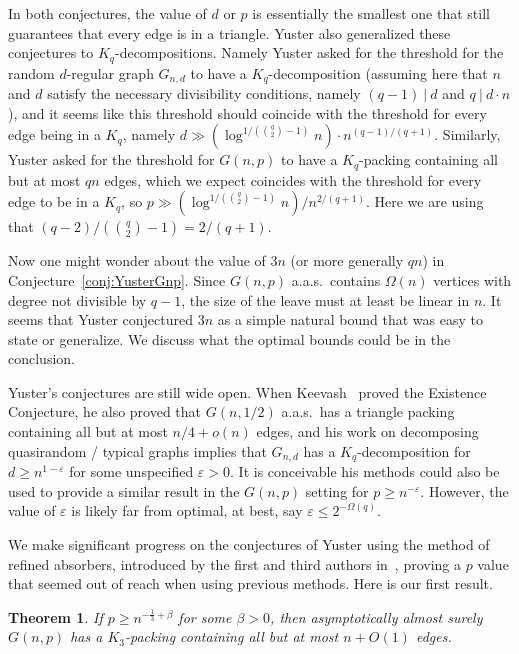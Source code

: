 \documentclass[11pt]{article}
\numberwithin{equation}{section}
\newcommand{\eps}{\varepsilon}
\newcounter{i}
\theoremstyle{plain}
\newtheorem{thm}{Theorem}[section]
\theoremstyle{plain} %
\theoremstyle{definition}
\newcommand{\aas}{a.a.s.\ }
\begin{document}
In both conjectures, the value of $d$ or $p$ is essentially the smallest one that still guarantees that every edge is in a triangle. 
Yuster also generalized these conjectures to $K_q$-decompositions.
Namely Yuster asked for the threshold for the random $d$-regular graph $G_{n,d}$ to have a $K_q$-decomposition (assuming here that $n$ and $d$ satisfy the necessary divisibility conditions, namely $(q-1)~|~d$ and $q~|~d\cdot n$), and it seems like this threshold should coincide with the threshold for every edge being in a $K_q$, namely $d \gg \left(\log^{1/\left(\binom{q}{2}-1\right)}n\right)\cdot n^{(q-1)/(q+1)}$.  Similarly, Yuster asked for the threshold for $G(n, p)$ to have a $K_q$-packing containing all but at most $qn$ edges, which we expect coincides with the threshold for every edge to be in a $K_q$, so $p \gg \left(\log^{1/\left(\binom{q}{2}-1\right)}n\right) / n^{2/(q+1)}$.  Here we are using that $(q - 2)/\left(\binom{q}{2} - 1\right) = 2/(q + 1)$.

Now one might wonder about the value of $3n$ (or more generally $qn$) in Conjecture~\ref{conj:YusterGnp}. 
Since $G(n,p)$ \aas contains $\Omega(n)$ vertices with degree not divisible by $q - 1$, the size of the leave must at least be linear in $n$.
It seems that Yuster conjectured $3n$ as a simple natural bound that was easy to state or generalize. 
We discuss what the optimal bounds could be in the conclusion. 

Yuster's conjectures are still wide open.  When Keevash~\cite{K14} proved the Existence Conjecture, he also proved that $G(n, 1/2)$ \aas has a triangle packing containing all but at most $n/4 + o(n)$ edges, and his work on decomposing quasirandom / typical graphs implies that $G_{n,d}$ has a $K_q$-decomposition for $d \geq n^{1 - \eps}$ for some unspecified $\eps > 0$.  It is conceivable his methods could also be used to provide a similar result in the $G(n,p)$ setting for $p \geq n^{-\eps}$.  However, the value of $\eps$ is likely far from optimal, at best, say $\eps \leq 2^{-\Omega(q)}$.

We make significant progress on the conjectures of Yuster using the method of refined absorbers, introduced by the first and third authors in~\cite{DPI}, proving a $p$ value that seemed out of reach when using previous methods.
Here is our first result. 

\begin{thm}\label{thm:YusterTriangle}
If $p\ge n^{-\frac{1}{3}+\beta}$ for some $\beta > 0$, then asymptotically almost surely $G(n,p)$ has a $K_3$-packing containing all but at most $n+O(1)$ edges.
\end{thm}
\end{document}
